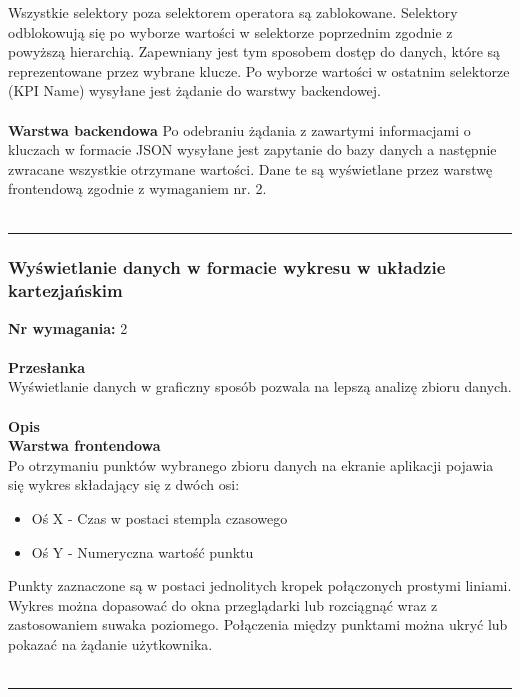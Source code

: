 \documentclass[eng,printmode]{mgr}
\begin{document}
Wszystkie selektory poza selektorem operatora są zablokowane. Selektory odblokowują się po wyborze wartości w selektorze poprzednim zgodnie z powyższą hierarchią. Zapewniany jest tym sposobem dostęp do danych, które są reprezentowane przez wybrane klucze. Po wyborze wartości w ostatnim selektorze (KPI Name) wysyłane jest żądanie do warstwy backendowej. 
\\\\
\textbf{Warstwa backendowa}
Po odebraniu żądania z zawartymi informacjami o kluczach w formacie JSON wysyłane jest zapytanie do bazy danych a następnie zwracane wszystkie otrzymane wartości. Dane te są wyświetlane przez warstwę frontendową zgodnie z wymaganiem nr. 2.
\\\\\noindent\rule{\textwidth}{2pt}
\subsubsection{Wyświetlanie danych w formacie wykresu w układzie kartezjańskim}
\textbf{Nr wymagania:} 2
\\\\
\textbf{Przesłanka}\\
Wyświetlanie danych w graficzny sposób pozwala na lepszą analizę zbioru danych.
\\\\
\textbf{Opis}\\
\textbf{Warstwa frontendowa} \\
Po otrzymaniu punktów wybranego zbioru danych na ekranie aplikacji pojawia się wykres składający się z dwóch osi:
\begin{itemize}
  \item Oś X - Czas w postaci stempla czasowego
  \item Oś Y - Numeryczna wartość punktu 
\end{itemize}
Punkty zaznaczone są w postaci jednolitych kropek połączonych prostymi liniami. Wykres można dopasować do okna przeglądarki lub rozciągnąć wraz z zastosowaniem suwaka poziomego. Połączenia między punktami można ukryć lub pokazać na żądanie użytkownika.
\\\\\noindent\rule{\textwidth}{2pt}
\end{document}
